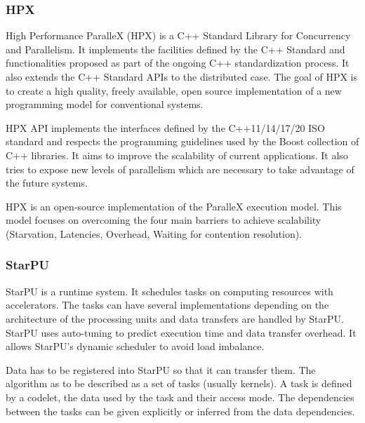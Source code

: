 \subsubsection{HPX}
High Performance ParalleX (HPX) \cite{KHASF2014} is a C++ Standard Library for Concurrency and Parallelism.
It implements the facilities defined by the C++ Standard and functionalities proposed as part of the ongoing C++ standardization process.
It also extends the C++ Standard APIs to the distributed case.
The goal of HPX is to create a high quality, freely available, open source implementation of a new programming model for conventional systems.

HPX API implements the interfaces defined by the C++11/14/17/20 ISO standard and respects the programming guidelines used by the Boost collection of C++ libraries.
It aims to improve the scalability of current applications.
It also tries to expose new levels of parallelism which are necessary to take advantage of the future systems.

HPX is an open-source implementation of the ParalleX execution model.
This model focuses on overcoming the four main barriers to achieve scalability (Starvation, Latencies, Overhead, Waiting for contention resolution).

\subsubsection{StarPU}
StarPU \cite{AuTNW2011} is a runtime system.
It schedules tasks on computing resources with accelerators.
The tasks can have several implementations depending on the architecture of the processing units and data transfers are handled by StarPU.
StarPU uses auto-tuning to predict execution time and data transfer overhead.
It allows StarPU's dynamic scheduler to avoid load imbalance.

Data has to be registered into StarPU so that it can transfer them.
The algorithm as to be described as a set of tasks (usually kernels).
A task is defined by a codelet, the data used by the task and their access mode.
The dependencies between the tasks can be given explicitly or inferred from the data dependencies.

